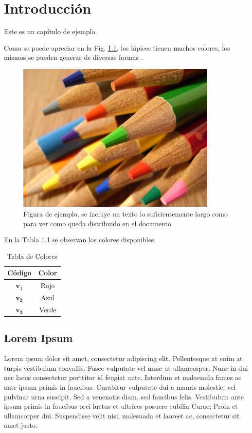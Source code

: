 \chapter{Introducción} \label{intro}
Este es un capítulo de ejemplo. 

Como se puede apreciar en la Fig. \ref{fig1_intro}, los lápices tienen muchos colores, los mismos se pueden generar de diversas formas \cite{ejemplo}.
\begin{figure}[htb]
	\centering
	\includegraphics[width=10cm]{figs/chapter1/sample.jpg}
	\caption[Figura de ejemplo]{Figura de ejemplo, se incluye un texto lo suficientemente largo como para ver como queda distribuido en el documento}
	\label{fig1_intro}
\end{figure}

En la Tabla \ref{table1_intro} se observan los colores disponibles.
\begin{table}[htb]
\renewcommand{\arraystretch}{1.3}
	\caption{Tabla de Colores}
	\label{table1_intro}
	\centering
	\setlength\tabcolsep{2pt}
	\begin{tabular}{c c}
		\hline
		\bfseries Código & \bfseries Color\\
		\hline
		$\mathbf{v_1}$ & Rojo\\
		$\mathbf{v_2}$ & Azul\\
		$\mathbf{v_3}$ & Verde\\
		\hline
	\end{tabular}
\end{table}

\section{Lorem Ipsum}
Lorem ipsum dolor sit amet, consectetur adipiscing elit. Pellentesque at enim at turpis vestibulum convallis. Fusce vulputate vel nunc ut ullamcorper. Nunc in dui nec lacus consectetur porttitor id feugiat ante. Interdum et malesuada fames ac ante ipsum primis in faucibus. Curabitur vulputate dui a mauris molestie, vel pulvinar urna suscipit. Sed a venenatis diam, sed faucibus felis. Vestibulum ante ipsum primis in faucibus orci luctus et ultrices posuere cubilia Curae; Proin et ullamcorper dui. Suspendisse velit nisi, malesuada et laoreet ac, consectetur sit amet justo.

